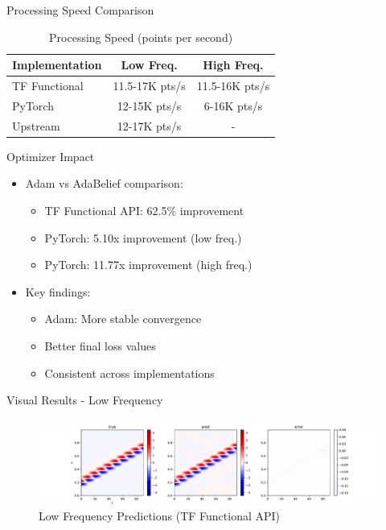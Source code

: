 \documentclass{beamer}
\begin{document}
\begin{frame}{Processing Speed Comparison}
    \begin{table}
        \centering
        \begin{tabular}{lcc}
            \hline
            \textbf{Implementation} & \textbf{Low Freq.} & \textbf{High Freq.} \\
            \hline
            TF Functional & 11.5-17K pts/s & 11.5-16K pts/s \\
            PyTorch & 12-15K pts/s & 6-16K pts/s \\
            Upstream & 12-17K pts/s & - \\
            \hline
        \end{tabular}
        \caption{Processing Speed (points per second)}
    \end{table}
\end{frame}

\begin{frame}{Optimizer Impact}
    \begin{itemize}
        \item Adam vs AdaBelief comparison:
        \begin{itemize}
            \item TF Functional API: 62.5\% improvement
            \item PyTorch: 5.10x improvement (low freq.)
            \item PyTorch: 11.77x improvement (high freq.)
        \end{itemize}
        \item Key findings:
        \begin{itemize}
            \item Adam: More stable convergence
            \item Better final loss values
            \item Consistent across implementations
        \end{itemize}
    \end{itemize}
\end{frame}

\begin{frame}{Visual Results - Low Frequency}
    \begin{figure}
        \includegraphics[width=\textwidth]{../../results/functional/low-frequency-adam-20250206-1105-1/vis}
        \caption{Low Frequency Predictions (TF Functional API)}
    \end{figure}
\end{frame}
\end{document}
